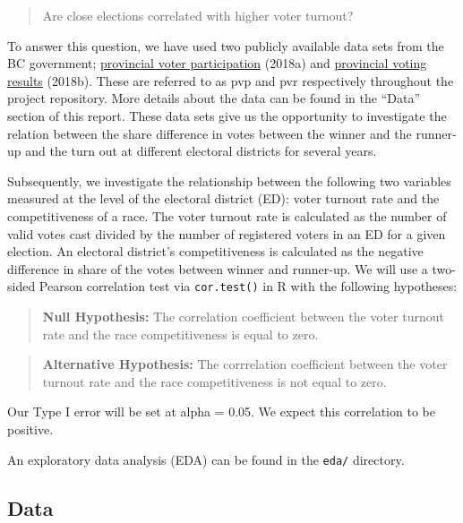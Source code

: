 \documentclass[
]{article}
\begin{document}
\begin{quote}
Are close elections correlated with higher voter turnout?
\end{quote}

To answer this question, we have used two publicly available data sets
from the BC government;
\href{https://catalogue.data.gov.bc.ca/dataset/6d9db663-8c30-43ec-922b-d541d22e634f/resource/646530d4-078c-4815-8452-c75639962bb4}{provincial
voter participation} (2018a) and
\href{https://catalogue.data.gov.bc.ca/dataset/44914a35-de9a-4830-ac48-870001ef8935/resource/fb40239e-b718-4a79-b18f-7a62139d9792}{provincial
voting results} (2018b). These are referred to as pvp and pvr
respectively throughout the project repository. More details about the
data can be found in the ``Data'' section of this report. These data
sets give us the opportunity to investigate the relation between the
share difference in votes between the winner and the runner-up and the
turn out at different electoral districts for several years.

Subsequently, we investigate the relationship between the following two
variables measured at the level of the electoral district (ED): voter
turnout rate and the competitiveness of a race. The voter turnout rate
is calculated as the number of valid votes cast divided by the number of
registered voters in an ED for a given election. An electoral district's
competitiveness is calculated as the negative difference in share of the
votes between winner and runner-up. We will use a two-sided Pearson
correlation test via \texttt{cor.test()} in R with the following
hypotheses:

\begin{quote}
\textbf{Null Hypothesis:} The correlation coefficient between the voter
turnout rate and the race competitiveness is equal to zero.
\end{quote}

\begin{quote}
\textbf{Alternative Hypothesis:} The corrrelation coefficient between
the voter turnout rate and the race competitiveness is not equal to
zero.
\end{quote}

Our Type I error will be set at alpha = 0.05. We expect this correlation
to be positive.

An exploratory data analysis (EDA) can be found in the \texttt{eda/}
directory.

\hypertarget{data}{%
\subsection{Data}\label{data}}
\end{document}
